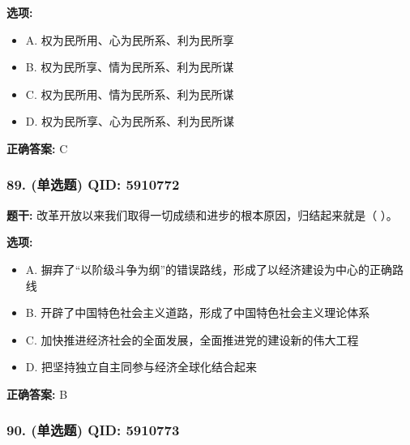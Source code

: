 \documentclass[12pt,UTF8]{ctexart}
\begin{document}
\textbf{选项:}
\begin{itemize}[leftmargin=*]

  \item A. 权为民所用、心为民所系、利为民所享

  \item B. 权为民所享、情为民所系、利为民所谋

  \item C. 权为民所用、情为民所系、利为民所谋

  \item D. 权为民所享、心为民所系、利为民所谋

\end{itemize}

\textbf{正确答案:}
C

\vspace{0.3em}\hrulefill\vspace{0.7em}

\subsubsection*{89. (单选题) \small QID: 5910772}

\textbf{题干:}
改革开放以来我们取得一切成绩和进步的根本原因，归结起来就是（ ）。

\textbf{选项:}
\begin{itemize}[leftmargin=*]

  \item A. 摒弃了“以阶级斗争为纲”的错误路线，形成了以经济建设为中心的正确路线

  \item B. 开辟了中国特色社会主义道路，形成了中国特色社会主义理论体系

  \item C. 加快推进经济社会的全面发展，全面推进党的建设新的伟大工程

  \item D. 把坚持独立自主同参与经济全球化结合起来

\end{itemize}

\textbf{正确答案:}
B

\vspace{0.3em}\hrulefill\vspace{0.7em}

\subsubsection*{90. (单选题) \small QID: 5910773}
\end{document}
